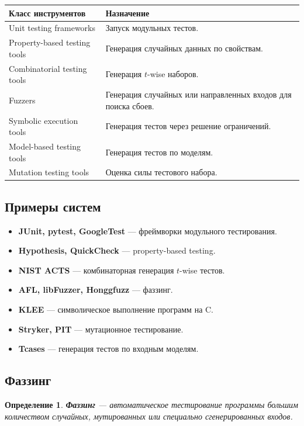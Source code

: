 \documentclass[12pt,a4paper]{article}
\newtheorem{definition}{Определение}
\begin{document}
\begin{center}
\begin{tabular}{p{4cm} p{9cm}}
\toprule
\textbf{Класс инструментов} & \textbf{Назначение} \\
\midrule
Unit testing frameworks & Запуск модульных тестов. \\
Property-based testing tools & Генерация случайных данных по свойствам. \\
Combinatorial testing tools & Генерация $t$-wise наборов. \\
Fuzzers & Генерация случайных или направленных входов для поиска сбоев. \\
Symbolic execution tools & Генерация тестов через решение ограничений. \\
Model-based testing tools & Генерация тестов по моделям. \\
Mutation testing tools & Оценка силы тестового набора. \\
\bottomrule
\end{tabular}
\end{center}

\subsection{Примеры систем}

\begin{itemize}
    \item \textbf{JUnit, pytest, GoogleTest} --- фреймворки модульного тестирования.
    \item \textbf{Hypothesis, QuickCheck} --- property-based testing.
    \item \textbf{NIST ACTS} --- комбинаторная генерация $t$-wise тестов.
    \item \textbf{AFL, libFuzzer, Honggfuzz} --- фаззинг.
    \item \textbf{KLEE} --- символическое выполнение программ на C.
    \item \textbf{Stryker, PIT} --- мутационное тестирование.
    \item \textbf{Tcases} --- генерация тестов по входным моделям.
\end{itemize}

\subsection{Фаззинг}

\begin{definition}
\textbf{Фаззинг} --- автоматическое тестирование программы большим количеством случайных, мутированных или специально сгенерированных входов.
\end{definition}
\end{document}
